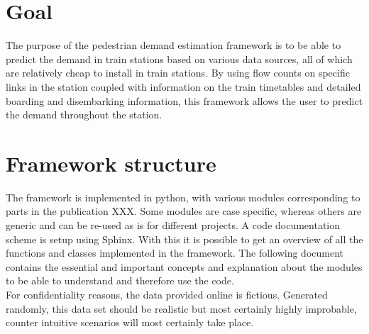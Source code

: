 \documentclass[a4paper,12pt]{article}
\begin{document}
\section{Goal}
The purpose of the pedestrian demand estimation framework is to be able to predict the demand in train stations based on various data sources, all of which are relatively cheap to install in train stations. By using flow counts on specific links in the station coupled with information on the train timetables and  detailed boarding and disembarking information, this framework allows the user to predict the demand throughout the station.\\
\section{Framework structure}
The framework is implemented in python, with various modules corresponding to parts in the publication XXX. Some modules are case specific, whereas others are generic and can be re-used as is for different projects. A code documentation scheme is setup using Sphinx. With this it is possible to get an overview of all the functions and classes implemented in the framework. The following document contains the essential and important concepts and explanation about the modules to be able to understand and therefore use the code.\\
For confidentiality reasons, the data provided online is fictious. Generated randomly, this data set should be realistic but most certainly highly improbable, counter intuitive scenarios will most certainly take place.
\end{document}
